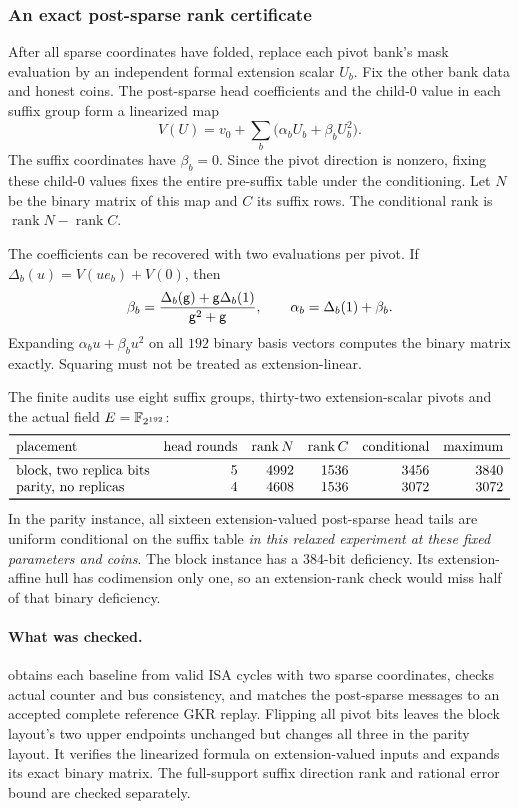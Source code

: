 \subsubsection{An exact post-sparse rank certificate}

After all sparse coordinates have folded, replace each pivot bank's mask evaluation by an independent formal extension scalar $U_b$. Fix the other bank data and honest coins. The post-sparse head coefficients and the child-$0$ value in each suffix group form a linearized map
\[
 V(U)=v_0+\sum_b\bigl(\alpha_bU_b+\beta_bU_b^2\bigr).
\]
The suffix coordinates have $\beta_b=0$. Since the pivot direction is nonzero, fixing these child-$0$ values fixes the entire pre-suffix table under the conditioning. Let $N$ be the binary matrix of this map and $C$ its suffix rows. The conditional rank is $\operatorname{rank}N-\operatorname{rank}C$.

The coefficients can be recovered with two evaluations per pivot. If $\Delta_b(u)=V(ue_b)+V(0)$, then
\[
 \beta_b=\frac{\Delta_b(\mathsf{g})+\mathsf{g}\Delta_b(1)}{\mathsf{g}^2+\mathsf{g}},
 \qquad \alpha_b=\Delta_b(1)+\beta_b.
\]
Expanding $\alpha_bu+\beta_bu^2$ on all $192$ binary basis vectors computes the binary matrix exactly. Squaring must not be treated as extension-linear.

The finite audits use eight suffix groups, thirty-two extension-scalar pivots and the actual field $E=\mathbb{F}_{2^{192}}$:
\[
\begin{array}{lrrrrr}
\toprule
\text{placement}&\text{head rounds}&\operatorname{rank}N&\operatorname{rank}C&\text{conditional}&\text{maximum}\\
\midrule
\text{block, two replica bits}&5&4992&1536&3456&3840\\
\text{parity, no replicas}&4&4608&1536&3072&3072\\
\bottomrule
\end{array}
\]
In the parity instance, all sixteen extension-valued post-sparse head tails are uniform conditional on the suffix table \emph{in this relaxed experiment at these fixed parameters and coins}. The block instance has a $384$-bit deficiency. Its extension-affine hull has codimension only one, so an extension-rank check would miss half of that binary deficiency.

\paragraph{What was checked.}  obtains each baseline from valid ISA cycles with two sparse coordinates, checks actual counter and bus consistency, and matches the post-sparse messages to an accepted complete reference GKR replay. Flipping all pivot bits leaves the block layout's two upper endpoints unchanged but changes all three in the parity layout. It verifies the linearized formula on extension-valued inputs and expands its exact binary matrix. The full-support suffix direction rank and rational error bound are checked separately.

